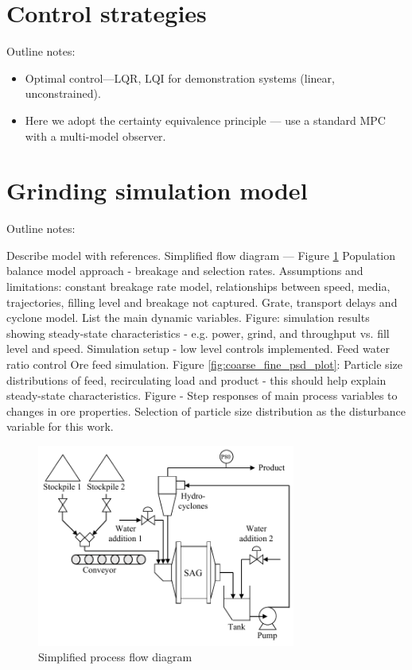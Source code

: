 
\section{Control strategies}

Outline notes:
\begin{itemize}
	\item Optimal control—LQR, LQI for demonstration systems (linear, unconstrained).
	\item Here we adopt the certainty equivalence principle — use a standard MPC with a multi-model observer.
\end{itemize}

\section{Grinding simulation model}

Outline notes:
\begin{outline}
	\1 Describe model with references.
	\1 Simplified flow diagram — Figure \ref{fig:sag-diag}
	\1 Population balance model approach - breakage and selection rates.
    \1 Assumptions and limitations: constant breakage rate model, relationships between speed, media, trajectories,  filling level and breakage not captured.
	\1 Grate, transport delays and cyclone model.
	\1 List the main dynamic variables.
	\1 Figure: simulation results showing steady-state characteristics - e.g. power, grind, and throughput vs. fill level and speed.
	\1 Simulation setup - low level controls implemented.
	\2 Feed water ratio control
	\2 Ore feed simulation.
	\1 Figure \ref{fig:coarse_fine_psd_plot}: Particle size distributions of feed, recirculating load and product - this should help explain steady-state characteristics.
	\1 Figure - Step responses of main process variables to changes in ore properties.
	\1 Selection of particle size distribution as the disturbance variable for this work.
\end{outline}



\begin{figure}[htp]
	\centering
	\includegraphics[width=8.5cm]{images/sag-circuit-diag.pdf}
	\caption{Simplified process flow diagram}
	\label{fig:sag-diag}
\end{figure}

